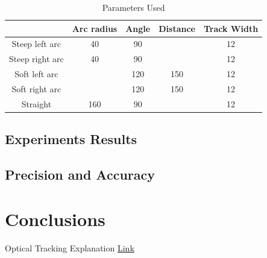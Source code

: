 \documentclass[10pt]{scrartcl}
\begin{document}
\begin{table}[ht!]
\centering
\caption{Parameters Used}
\label{tab:1}
\begin{tabular}{|c|c|c|c|c|} \hline
 				& Arc radius& Angle & Distance & Track Width \\ \hline
Steep left arc  & 40        & 90    &          & 12 \\ \hline
Steep right arc & 40        & 90    &          & 12 \\ \hline
Soft left arc   &           & 120    & 150       & 12 \\ \hline
Soft right arc  &           & 120    & 150       & 12 \\ \hline
Straight        & 160        & 90    &          & 12 \\ \hline
 
\end{tabular}
\end{table}

\subsection*{Experiments Results}


\subsection*{Precision and Accuracy}


\section*{Conclusions}


\begin{thebibliography}{1}
 Optical Tracking Explanation \href{http://www.ps-tech.com/3d-technology/optical-tracking}{Link}
\end{thebibliography}
\end{document}
